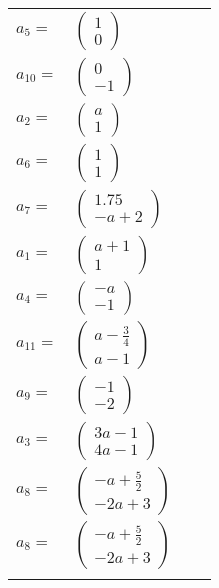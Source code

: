 \documentclass[1p]{elsarticle_modified}
\theoremstyle{definition}
\begin{document}
\begin{tabular}{m{7pt} m{180pt} m{7pt} m{180pt} }
\flushright $a_{5}=$&$\begin{pmatrix}1\\0\end{pmatrix}$ \\
\flushright $a_{10}=$&$\begin{pmatrix}0\\-1\end{pmatrix}$ \\
\flushright $a_{2}=$&$\begin{pmatrix}a\\1\end{pmatrix}$ \\
\flushright $a_{6}=$&$\begin{pmatrix}1\\1\end{pmatrix}$ \\
\flushright $a_{7}=$&$\begin{pmatrix}1.75\\- a+2\end{pmatrix}$ \\
\flushright $a_{1}=$&$\begin{pmatrix}a+1\\1\end{pmatrix}$ \\
\flushright $a_{4}=$&$\begin{pmatrix}- a\\-1\end{pmatrix}$ \\
\flushright $a_{11}=$&$\begin{pmatrix}a-\frac{3}{4}\\a-1\end{pmatrix}$ \\
\flushright $a_{9}=$&$\begin{pmatrix}-1\\-2\end{pmatrix}$ \\
\flushright $a_{3}=$&$\begin{pmatrix}3 a-1\\4 a-1\end{pmatrix}$ \\
\flushright $a_{8}=$&$\begin{pmatrix}- a+\frac{5}{2}\\-2 a+3\end{pmatrix}$\\ \flushright $a_{8}=$&$\begin{pmatrix}- a+\frac{5}{2}\\-2 a+3\end{pmatrix}$\\&\end{tabular}
\end{document}
